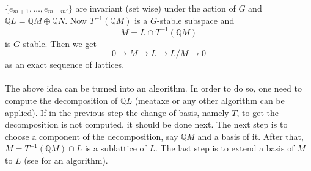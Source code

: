 \documentclass{article}
\theoremstyle{plain}
\theoremstyle{definition}
\newcommand{\Z}{\ensuremath{\mathbb{Z}}}
\newcommand{\Q}{\ensuremath{\mathbb{Q}}}
\begin{document}
$\lbrace e_{m+1}, \ldots , e_{m+m'} \rbrace$ are invariant (set wise) under the action of $G$ and $\Q L = \Q M \oplus \Q N$. Now $T^{-1}(\Q M)$ is a $G$-stable subspace and $$M = L \cap T^{-1}(\Q M) $$ is $G$ stable. Then we get 
$$0 \longrightarrow M \longrightarrow L \longrightarrow L/M \longrightarrow 0$$
as an exact sequence of lattices.\\
\\
The above idea can be turned into an algorithm. In order to do so, one need to compute the decomposition of $\Q L$ (meataxe or any other algorithm can be applied). If in the previous step the change of basis, namely $T$, to get the decomposition is not computed, it should be done next. The next step is to choose a component of the decomposition, say $\Q M$ and a basis of it. After that, $M = T^{-1}(\Q M) \cap L$ is a sublattice of $L$. The last step is to extend a basis of $M$ to $L$ (see \cite{LatticeBase} for an algorithm). \\
\\
\end{document}
